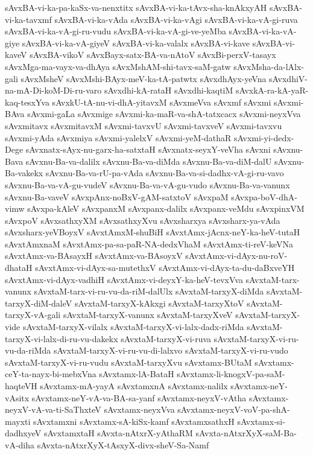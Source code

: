 {sAvxBA-vi-ka-pa-kaSx-va-nenxtitx
sAvxBA-vi-ka-tAvx-sha-knAkxyAH
sAvxBA-vi-ka-tavxmf
sAvxBA-vi-ka-vAda
sAvxBA-vi-ka-vAgi
sAvxBA-vi-ka-vA-gi-ruva
sAvxBA-vi-ka-vA-gi-ru-vudu
sAvxBA-vi-ka-vA-gi-ve-yeMba
sAvxBA-vi-ka-vA-giye
sAvxBA-vi-ka-vA-giyeV
sAvxBA-vi-ka-valalx
sAvxBA-vi-kave
sAvxBA-vi-kaveV
sAvxBA-vikoV
sAvxBayx-satx-BA-va-nAtoV
sAvxBi-perxV-tasayx
sAvxMga-ma-vayx-va-dhAya
sAvxMshAM-shi-tavx-saM-gatw
sAvxMsha-da-lAlx-gali
sAvxMsheV
sAvxMshi-BAyx-meV-ka-tA-patwtx
sAvxdhAyx-yeVna
sAvxdhiV-na-mA-Di-koM-Di-ru-varo
sAvxdhi-kA-rataH
sAvxdhi-kaqtiM
sAvxkA-ra-kA-yaR-kaq-tesxYva
sAvxkU-tA-nu-vi-dhA-yitavxM
sAvxmeVva
sAvxmf
sAvxmi
sAvxmi-BAva
sAvxmi-gaLa
sAvxmige
sAvxmi-ka-maR-va-shA-tatxcacx
sAvxmi-neyxVva
sAvxmitavx
sAvxmitavxM
sAvxmi-tavxvU
sAvxmi-tavxveV
sAvxmi-tavxvu
sAvxmi-yAda
sAvxmiya
sAvxmi-yalelxV
sAvxmi-yeM-dathaR
sAvxmi-yi-dedx-Dege
sAvxnatx-sAyx-nu-garx-ha-satxtaH
sAvxnatx-seyxY-veVha
sAvxni
sAvxnu-Bava
sAvxnu-Ba-va-dalilx
sAvxnu-Ba-va-diMda
sAvxnu-Ba-va-diM-dalU
sAvxnu-Ba-vakekx
sAvxnu-Ba-va-rU-pa-vAda
sAvxnu-Ba-va-si-dadhx-vA-gi-ru-vavo
sAvxnu-Ba-va-vA-gu-vudeV
sAvxnu-Ba-va-vA-gu-vudo
sAvxnu-Ba-va-vanunx
sAvxnu-Ba-vaveV
sAvxpAnx-noBxV-gAM-satxtoV
sAvxpaM
sAvxpa-boV-dhA-vimw
sAvxpa-kAleV
sAvxpanxM
sAvxpanx-dalilx
sAvxpanx-veMdu
sAvxpinxVM
sAvxpoV
sAvxsathxyXM
sAvxsathxyXvu
sAvxsharxya
sAvxsharx-ya-vAda
sAvxsharx-yeVBoyxV
sAvxtAmxM-shuBiH
sAvxtAmx-jAcnx-neY-ka-heV-tutaH
sAvxtAmxnaM
sAvxtAmx-pa-sa-paR-NA-dedxVhaM
sAvxtAmx-ti-reV-keVNa
sAvxtAmx-va-BAsayxH
sAvxtAmx-va-BAsoyxV
sAvxtAmx-vi-dAyx-nu-roV-dhataH
sAvxtAmx-vi-dAyx-sa-mutethxV
sAvxtAmx-vi-dAyx-ta-du-daBxveYH
sAvxtAmx-vi-dAyx-vadhiH
sAvxtAmx-vi-deyxY-ka-heV-tevxVva
sAvxtaM-tarx-vanunx
sAvxtaM-tarx-vi-ru-vu-da-riM-dalUlx
sAvxtaM-tarxyX-diMda
sAvxtaM-tarxyX-diM-daleV
sAvxtaM-tarxyX-kAkxgi
sAvxtaM-tarxyXtoV
sAvxtaM-tarxyX-vA-gali
sAvxtaM-tarxyX-vanunx
sAvxtaM-tarxyXveV
sAvxtaM-tarxyX-vide
sAvxtaM-tarxyX-vilalx
sAvxtaM-tarxyX-vi-lalx-dadx-riMda
sAvxtaM-tarxyX-vi-lalx-di-ru-vu-dakekx
sAvxtaM-tarxyX-vi-ruva
sAvxtaM-tarxyX-vi-ru-vu-da-riMda
sAvxtaM-tarxyX-vi-ru-vu-di-lalxvo
sAvxtaM-tarxyX-vi-ru-vudo
sAvxtaM-tarxyX-vi-ru-vudu
sAvxtaM-tarxyXvu
sAvxtamx-BUtaM
sAvxtamx-ceY-ta-nayx-bi-mebxVna
sAvxtamx-lA-BataH
sAvxtamx-li-knogxV-pa-saM-haqteVH
sAvxtamx-mA-yayA
sAvxtamxnA
sAvxtamx-nalilx
sAvxtamx-neY-vAsitx
sAvxtamx-neY-vA-va-BA-sa-yanf
sAvxtamx-neyxV-vAtha
sAvxtamx-neyxV-vA-va-ti-SaThxteV
sAvxtamx-neyxVva
sAvxtamx-neyxV-voV-pa-shA-mayxti
sAvxtamxni
sAvxtamx-sA-kiSx-kamf
sAvxtamxsathxH
sAvxtamx-si-dadhxyeV
sAvxtamxtaH
sAvxta-nAtxrX-yAthaRM
sAvxta-nAtxrXyX-saM-Ba-vA-diha
sAvxta-nAtxrXyX-tAsxyX-divx-sheV-Sa-Namf
}
